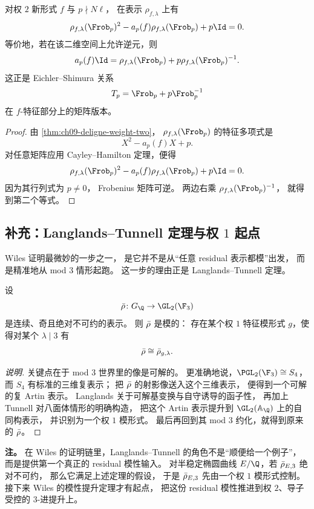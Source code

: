 \begin{proposition}
\label{prop:ch09-eichler-shimura-rep-form}
对权 $2$ 新形式 $f$ 与 $p\nmid N\ell$，
在表示 $\rho_{f,\lambda}$ 上有
\[
  \rho_{f,\lambda}(\Frob_p)^2-a_p(f)\rho_{f,\lambda}(\Frob_p)+p\Id=0.
\]
等价地，若在该二维空间上允许逆元，则
\[
  a_p(f)\Id=\rho_{f,\lambda}(\Frob_p)+p\rho_{f,\lambda}(\Frob_p)^{-1}.
\]
这正是 Eichler--Shimura 关系
\[
  T_p=\Frob_p+p\Frob_p^{-1}
\]
在 $f$-特征部分上的矩阵版本。
\end{proposition}

\begin{proof}
由 \cref{thm:ch09-deligne-weight-two}，
$\rho_{f,\lambda}(\Frob_p)$ 的特征多项式是
\[
  X^2-a_p(f)X+p.
\]
对任意矩阵应用 Cayley--Hamilton 定理，便得
\[
  \rho_{f,\lambda}(\Frob_p)^2-a_p(f)\rho_{f,\lambda}(\Frob_p)+p\Id=0.
\]
因为其行列式为 $p\neq 0$，
Frobenius 矩阵可逆。
两边右乘 $\rho_{f,\lambda}(\Frob_p)^{-1}$，
就得到第二个等式。
\end{proof}

\subsection*{补充：Langlands--Tunnell 定理与权 $1$ 起点}
Wiles 证明最微妙的一步之一，
是它并不是从“任意 residual 表示都模”出发，
而是精准地从 mod $3$ 情形起跑。
这一步的理由正是 Langlands--Tunnell 定理。

\begin{theorem}
\label{thm:ch09-langlands-tunnell}
设
\[
  \rhobar\colon G_\Q\to \GL_2(\F_3)
\]
是连续、奇且绝对不可约的表示。
则 $\bar{\rho}$ 是模的：
存在某个权 $1$ 特征模形式 $g$，使得对某个 $\lambda\mid 3$ 有
\[
  \bar{\rho}\cong \bar{\rho}_{g,\lambda}.
\]
\end{theorem}

\begin{proof}[说明]
关键点在于 mod $3$ 世界里的像是可解的。
更准确地说，$\PGL_2(\F_3)\cong S_4$，
而 $S_4$ 有标准的三维复表示；
把 $\bar{\rho}$ 的射影像送入这个三维表示，
便得到一个可解的复 Artin 表示。
Langlands 关于可解基变换与自守诱导的函子性，
再加上 Tunnell 对八面体情形的明确构造，
把这个 Artin 表示提升到 $\GL_2(\mathbb A_\Q)$ 上的自同构表示，
并识别为一个权 $1$ 模形式。
最后再回到其 mod $3$ 约化，就得到原来的 $\bar{\rho}$。
\end{proof}

\textbf{注。}
在 Wiles 的证明链里，Langlands--Tunnell 的角色不是“顺便给一个例子”，
而是提供第一个真正的 residual 模性输入。
对半稳定椭圆曲线 $E/\Q$，若 $\bar{\rho}_{E,3}$ 绝对不可约，
那么它满足上述定理的假设，
于是 $\bar{\rho}_{E,3}$ 先由一个权 $1$ 模形式控制。
接下来 Wiles 的模性提升定理才有起点，
把这份 residual 模性推进到权 $2$、导子受控的 $3$-进提升上。

